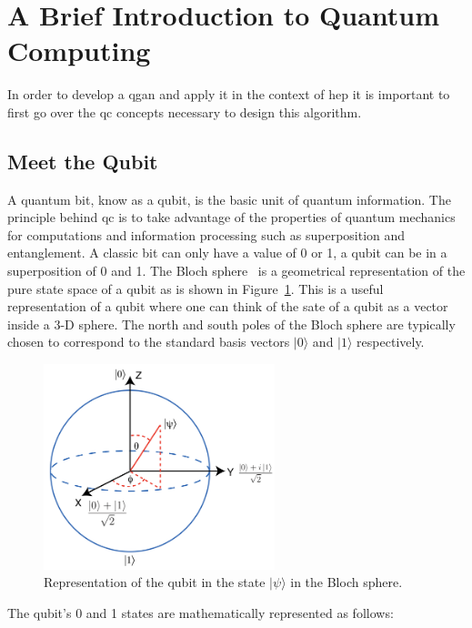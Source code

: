 \section{A Brief Introduction to Quantum Computing}
\label{sec:qc}

In order to develop a \gls{qgan} and apply it in the context of \gls{hep} it is
important to first go over the \gls{qc} concepts necessary to design this 
algorithm.

\subsection{Meet the Qubit}
\label{sec:qubit}

A quantum bit, know as a qubit, is the basic unit of quantum information. The 
principle behind \gls{qc} is to take advantage of the properties of quantum 
mechanics for computations and information processing such as superposition and 
entanglement. A classic bit can only have a value of 0 or 1, a qubit can be in a
superposition of 0 and 1. The Bloch sphere~\cite{Bloch} is a geometrical 
representation of the pure state space of a qubit as is shown in Figure~\ref{fig:bloch}. 
This is a useful representation of a qubit where one can think of the sate of a 
qubit as a vector inside a 3-D sphere. The north and south poles of the Bloch 
sphere are typically chosen to correspond to the standard basis vectors $\vert 0 \rangle$
and $\vert 1 \rangle$ respectively.

\begin{figure}[!htbp]
\centering
	\includegraphics[width=0.60\textwidth]{figures/Bloch_sphere.png}
\caption{Representation of the qubit in the state $\vert \psi \rangle$ in the
Bloch sphere.}
\label{fig:bloch}
\end{figure}

The qubit's 0 and 1 states are mathematically represented as follows:

